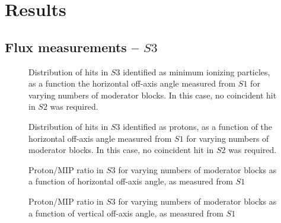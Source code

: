 \section{Results}
\label{hptpcPaper:sec:Results}

	\subsection{Flux measurements -- $S3$}

	\begin{figure}[h]
		\begin{minipage}{0.48\textwidth}
			\begin{adjustbox}{max totalsize={\textwidth}{.35\textheight},center}
				
			\end{adjustbox}
			\caption{Distribution of hits in $S3$ identified as minimum ionizing particles, as a function the horizontal off-axis angle measured from $S1$ for varying numbers of moderator blocks. In this case, no coincident hit in $S2$ was required.}
			\label{fig:s1s3mips}
		\end{minipage}
		\hspace{0.3cm}
		\begin{minipage}{0.48\textwidth}
			\begin{adjustbox}{max totalsize={\textwidth}{.35\textheight},center}
				
			\end{adjustbox}
			\caption{Distribution of hits in $S3$ identified as protons, as a function of the horizontal off-axis angle measured from $S1$ for varying numbers of moderator blocks. In this case, no coincident hit in $S2$ was required.}
			\label{fig:s1s3protons}
		\end{minipage}
	\end{figure}

	\begin{figure}[ht]
		\begin{minipage}[t]{0.48\textwidth}
			\begin{adjustbox}{max totalsize={\textwidth}{.35\textheight}, center}
				
			\end{adjustbox}
			\caption{Proton/MIP ratio in $S3$ for varying numbers of moderator blocks as a function of horizontal off-axis angle, as measured from $S1$}
			\label{fig:propiratio_s3_horz}
		\end{minipage}
		\hspace{0.3cm}
		\begin{minipage}[t]{0.48\textwidth}
			\begin{adjustbox}{max totalsize={\textwidth}{.35\textheight}, center}
				
			\end{adjustbox}
			\caption{Proton/MIP ratio in $S3$ for varying numbers of moderator blocks as a function of vertical off-axis angle, as measured from $S1$}
			\label{fig:propiratio_s3_vert}
		\end{minipage}	
	\end{figure}

